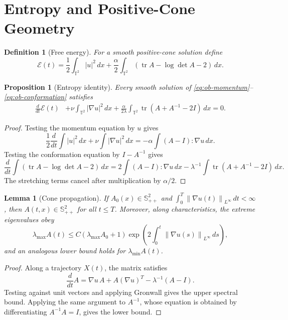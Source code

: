 \documentclass[11pt]{article}
\newtheorem{proposition}{Proposition}[section]
\newtheorem{lemma}{Lemma}[section]
\newtheorem{definition}{Definition}[section]
\newcommand{\T}{\mathbb T}
\newcommand{\Id}{I}
\newcommand{\Spp}{\mathbb S_{++}}
\newcommand{\tr}{\operatorname{tr}}
\newcommand{\dd}{\,dx}
\newcommand{\calE}{\mathcal E}
\newcommand{\norm}[1]{\left\lVert #1\right\rVert}
\begin{document}
\section{Entropy and Positive-Cone Geometry}
\label{sec:entropy}

\begin{definition}[Free energy]
For a smooth positive-cone solution define
\[
  \calE(t)
  =
  \frac12\int_{\T^2}|u|^2\dd
  +
  \frac{\alpha}{2}\int_{\T^2}
  \left(\tr A-\log\det A-2\right)\dd .
\]
\end{definition}

\begin{proposition}[Entropy identity]
\label{prop:entropy}
Every smooth solution of \eqref{eq:ob-momentum}--\eqref{eq:ob-conformation}
satisfies
\[
\begin{aligned}
  \frac{d}{dt}\calE(t)
  &+\nu\int_{\T^2}|\nabla u|^2\dd
  +\frac{\alpha}{2\lambda}
  \int_{\T^2}\tr(A+A^{-1}-2\Id)\dd=0 .
\end{aligned}
\label{eq:entropy}
\]
\end{proposition}

\begin{proof}
Testing the momentum equation by \(u\) gives
\[
  \frac12\frac{d}{dt}\int |u|^2\dd
  +\nu\int|\nabla u|^2\dd
  =
  -\alpha\int (A-\Id):\nabla u\dd .
\]
Testing the conformation equation by \(\Id-A^{-1}\) gives
\[
  \frac{d}{dt}\int(\tr A-\log\det A-2)\dd
  =
  2\int(A-\Id):\nabla u\dd
  -\lambda^{-1}\int\tr(A+A^{-1}-2\Id)\dd .
\]
The stretching terms cancel after multiplication by \(\alpha/2\).
\end{proof}

\begin{lemma}[Cone propagation]
\label{lem:cone}
If \(A_0(x)\in\Spp^2\) and
\(\int_0^T\norm{\nabla u(t)}_{L^\infty}\,dt<\infty\), then
\(A(t,x)\in\Spp^2\) for all \(t\le T\).  Moreover, along characteristics,
the extreme eigenvalues obey
\[
  \lambda_{\max}A(t)
  \le C\left(\lambda_{\max}A_0+1\right)
  \exp\left(2\int_0^t\norm{\nabla u(s)}_{L^\infty}\,ds\right),
\]
and an analogous lower bound holds for \(\lambda_{\min}A(t)\).
\end{lemma}

\begin{proof}
Along a trajectory \(X(t)\), the matrix satisfies
\[
  \frac{d}{dt}A=\nabla u\,A+A(\nabla u)^T-\lambda^{-1}(A-\Id).
\]
Testing against unit vectors and applying Gronwall gives the upper spectral
bound.  Applying the same argument to \(A^{-1}\), whose equation is obtained by
differentiating \(A^{-1}A=\Id\), gives the lower bound.
\end{proof}
\end{document}
